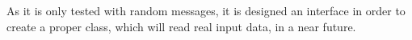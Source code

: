 
As it is only tested with random messages, it is designed an interface in order to create a proper class, which will read real input data, in a near future.

